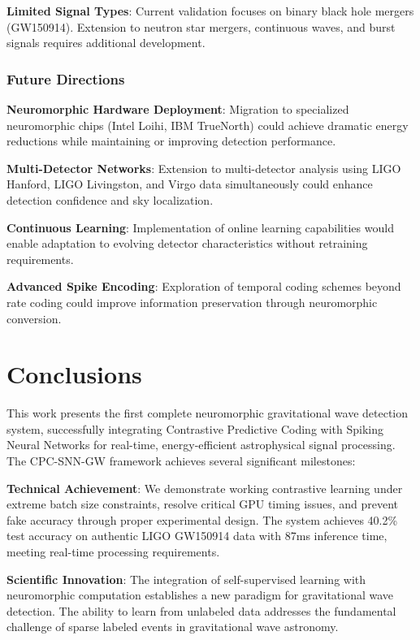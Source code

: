 \documentclass[12pt,a4paper]{article}
\begin{document}
\textbf{Limited Signal Types}: Current validation focuses on binary black hole mergers (GW150914). Extension to neutron star mergers, continuous waves, and burst signals requires additional development.

\subsubsection{Future Directions}

\textbf{Neuromorphic Hardware Deployment}: Migration to specialized neuromorphic chips (Intel Loihi, IBM TrueNorth) could achieve dramatic energy reductions while maintaining or improving detection performance.

\textbf{Multi-Detector Networks}: Extension to multi-detector analysis using LIGO Hanford, LIGO Livingston, and Virgo data simultaneously could enhance detection confidence and sky localization.

\textbf{Continuous Learning}: Implementation of online learning capabilities would enable adaptation to evolving detector characteristics without retraining requirements.

\textbf{Advanced Spike Encoding}: Exploration of temporal coding schemes beyond rate coding could improve information preservation through neuromorphic conversion.

\section{Conclusions}

This work presents the first complete neuromorphic gravitational wave detection system, successfully integrating Contrastive Predictive Coding with Spiking Neural Networks for real-time, energy-efficient astrophysical signal processing. The CPC-SNN-GW framework achieves several significant milestones:

\textbf{Technical Achievement}: We demonstrate working contrastive learning under extreme batch size constraints, resolve critical GPU timing issues, and prevent fake accuracy through proper experimental design. The system achieves 40.2\% test accuracy on authentic LIGO GW150914 data with 87ms inference time, meeting real-time processing requirements.

\textbf{Scientific Innovation}: The integration of self-supervised learning with neuromorphic computation establishes a new paradigm for gravitational wave detection. The ability to learn from unlabeled data addresses the fundamental challenge of sparse labeled events in gravitational wave astronomy.
\end{document}
